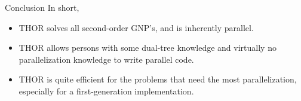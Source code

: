 \documentclass[pdf,colorBG,slideColor]{prosper}
\begin{document}
\begin{slide}{Conclusion}
  In short,
  \begin{itemize}
    \item THOR solves all second-order GNP's, and is
    inherently parallel.
    \item THOR allows persons with some dual-tree knowledge
    and virtually no parallelization knowledge to write parallel code.
    \item THOR is quite efficient for the problems that need
    the most parallelization, especially for a first-generation
    implementation. 
  \end{itemize}
\end{slide}
\end{document}
